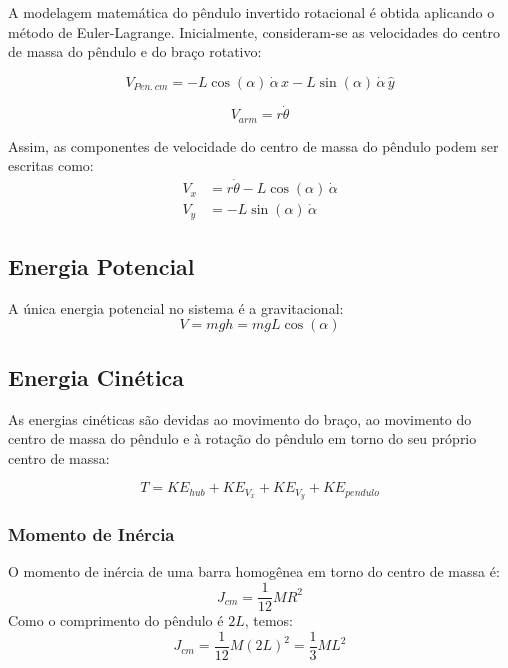 \documentclass[9pt,a4paper,twocolumn,twoside]{tau-class/tau}
\begin{document}
A modelagem matemática do pêndulo invertido rotacional é obtida aplicando o 
método de Euler-Lagrange. Inicialmente, consideram-se as velocidades do 
centro de massa do pêndulo e do braço rotativo:

\begin{equation}
    V_{Pen.\,cm} = -L \cos (\alpha) \, \dot{\alpha} \, \hat{x} - L \sin (\alpha) \, \dot{\alpha} \, \hat{y}
\end{equation}

\begin{equation}
    V_{arm} = r \dot{\theta}
\end{equation}

Assim, as componentes de velocidade do centro de massa do pêndulo podem ser escritas como:
\begin{align}
    V_x &= r\dot{\theta} - L\cos(\alpha) \, \dot{\alpha} \\
    V_y &= -L\sin(\alpha) \, \dot{\alpha}
\end{align}

\subsection{Energia Potencial}
A única energia potencial no sistema é a gravitacional:
\begin{equation}
    V = m g h = m g L \cos(\alpha)
\end{equation}

\subsection{Energia Cinética}
As energias cinéticas são devidas ao movimento do braço, ao movimento do centro 
de massa do pêndulo e à rotação do pêndulo em torno do seu próprio centro de massa:

\begin{equation}
    T = KE_{hub} + KE_{V_x} + KE_{V_y} + KE_{pendulo}
\end{equation}

\subsubsection*{Momento de Inércia}
O momento de inércia de uma barra homogênea em torno do centro de massa é:
\begin{equation}
    J_{cm} = \frac{1}{12} M R^2
\end{equation}
Como o comprimento do pêndulo é $2L$, temos:
\begin{equation}
    J_{cm} = \frac{1}{12} M (2L)^2 = \frac{1}{3} M L^2
\end{equation}
\end{document}
